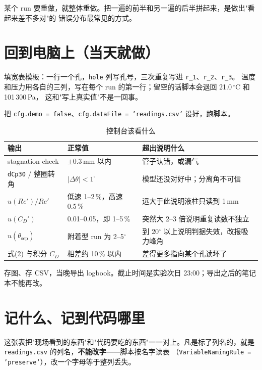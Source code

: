 \documentclass[11pt,a4paper]{ctexart}
\newcommand{\CD}{\ensuremath{C_D}}
\newcommand{\ReD}{\ensuremath{\mathit{Re}}}
\begin{document}
某个 run 要重做，就整体重做。把一遍的前半和另一遍的后半拼起来，是做出"看起来差不多对"的
错误分布最常见的方式。

\section{回到电脑上（当天就做）}

填宽表模板：一行一个孔，\texttt{hole} 列写孔号，三次重复写进 \texttt{r\_1}、\texttt{r\_2}、\texttt{r\_3}。
温度和压力用各自的三列，写在每个 run 的第一行；留空的话脚本会退回 21.0\,$^\circ$C 和 101\,300\,Pa，
这和"写上真实值"不是一回事。

把 \texttt{cfg.demo = false}、\texttt{cfg.dataFile = 'readings.csv'} 设好，跑脚本。

\begin{table}[H]
\centering
\caption{控制台该看什么}
\small
\begin{tabularx}{\textwidth}{@{}p{3.4cm} p{4.2cm} X@{}}
\toprule
输出 & 正常值 & 超出说明什么 \\
\midrule
stagnation check & $\pm0.3$\,mm 以内 & 管子认错，或漏气 \\
\texttt{dCp30} / 整圈转角 & $|\Delta\theta| < 1^\circ$ & 模型还没对好中；分离角不可信 \\
$u(\ReD')/\ReD'$ & 低速 1--2\,\%，高速 0.5\,\% & 远大于此说明液柱只读到 1\,mm \\
$u(\CD')$ & 0.01--0.05，即 1--5\,\% & 突然大 2--3 倍说明重复读数不独立 \\
$u(\theta_{\text{sep}})$ & 附着型 run 为 2--5$^\circ$ & 到 20$^\circ$ 以上说明判据失效，改报吸力峰角 \\
式(2) 与积分 \CD & 相差约 10\,\% 以内 & 差得更多指向某个孔读坏了 \\
\bottomrule
\end{tabularx}
\end{table}

存图、存 CSV，当晚导出 logbook。截止时间是实验次日 23:00；导出之后的笔记本不能再改。

\section{记什么、记到代码哪里}

这张表把"现场看到的东西"和"代码要吃的东西"一一对上。凡是标了列名的，就是
\texttt{readings.csv} 的列名，\textbf{不能改字}——脚本按名字读表
（\texttt{VariableNamingRule = 'preserve'}），改一个字母等于整列丢失。
\end{document}
